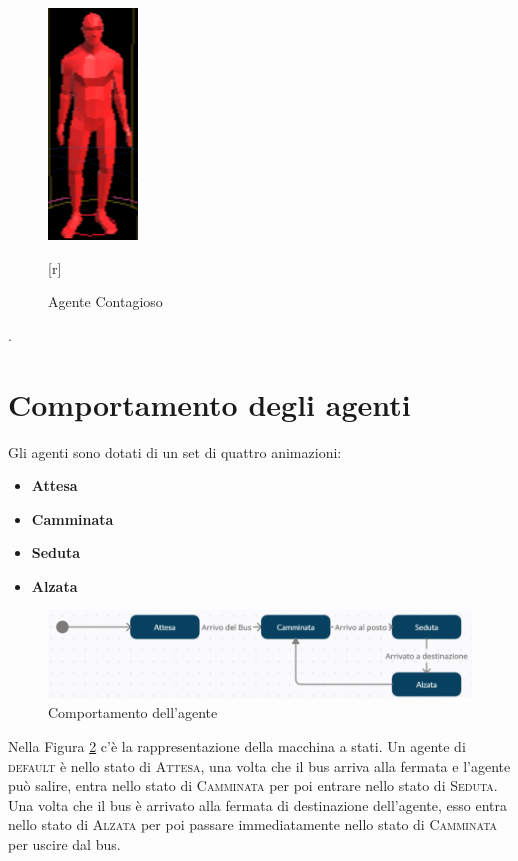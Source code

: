 \documentclass[12pt, openany]{book}
\begin{document}
	\begin{figure}[H]
		\centering
		\includegraphics[width=0.1\linewidth]{"Immagini/AgenteContagioso.png"}
		\caption{Agente Contagioso}[r]
		\label{fig:agenteContagioso}
	\end{figure}.
	\pagebreak
	\section{Comportamento degli agenti}
	Gli agenti sono dotati di un set di quattro animazioni:
	\begin{itemize}
		\item \textbf{Attesa}
		\item \textbf{Camminata}
		\item \textbf{Seduta}
		\item \textbf{Alzata}
	\end{itemize}
		\begin{figure}[H]
		\centering
		\includegraphics[width=1\linewidth]{"Immagini/StatiAnimazioni.png"}
		\caption{Comportamento dell'agente}
		
		\label{fig:StatiAnimazioni}
			\end{figure}
		Nella Figura \ref{fig:StatiAnimazioni} c'è la rappresentazione della macchina a stati. Un agente di \textsc{default} è nello stato di \textsc{Attesa}, una volta che il bus arriva alla fermata e l'agente può salire, entra nello stato di \textsc{Camminata} per poi entrare nello stato di \textsc{Seduta}. Una volta che il bus è arrivato alla fermata di destinazione dell'agente, esso entra nello stato di \textsc{Alzata} per poi passare immediatamente nello stato di \textsc{Camminata} per uscire dal bus.
\end{document}
